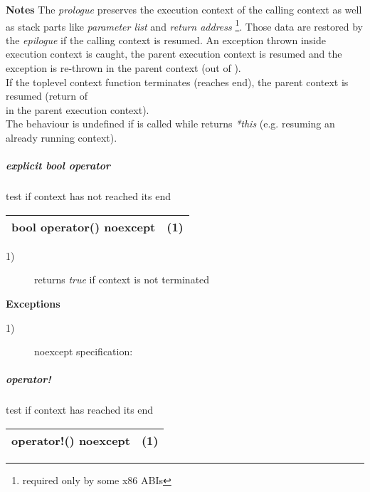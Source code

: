 {\bfseries Notes}
\newline
The \emph{prologue} preserves the execution context of the calling context as well
as stack parts like \emph{parameter list} and \emph{return address}
\footnote{required only by some x86 ABIs}. Those data are restored by the
\emph{epilogue} if the calling context is resumed.
\newline
An exception thrown inside execution context is caught, the parent execution
context is resumed and the exception is re-thrown in the parent context (out of
\ectxop).\\
If the toplevel context function terminates (reaches end), the parent context is
resumed (return of\\
\ectxop in the parent execution context).\\
The behaviour is undefined if  is called while 
returns \emph{*this} (e.g. resuming an already running context).

\subparagraph*{explicit bool operator}
test if context has not reached its end\\

\begin{tabular}{ l l }
    \midrule

    {\ttfamily\small\color{black}{\color{blue}explicit} {\color{blue}bool} {\color{blue}operator}() {\color{blue}noexcept}} & (1)\\

    \midrule
\end{tabular}

\begin{description}
    \item[1)] returns \emph{true} if context is not terminated\\
\end{description}

{\bfseries Exceptions}
\begin{description}
    \item[1)] noexcept specification: \\
\end{description}

\subparagraph*{operator!}
test if context has reached its end\\

\begin{tabular}{ l l }
    \midrule

    {\ttfamily\small\color{black}{\color{blue}bool} {\color{blue}operator}!() {\color{blue}noexcept}} & (1)\\

    \midrule
\end{tabular}

